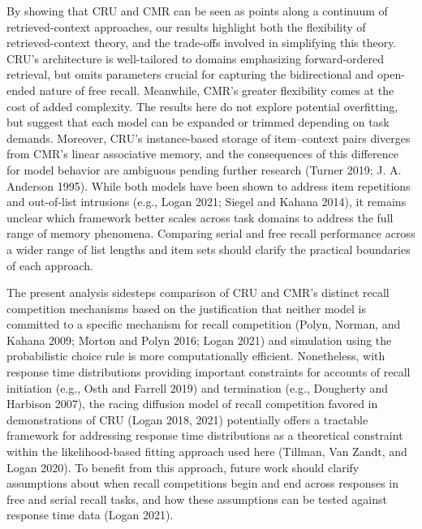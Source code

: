 \documentclass[
  letterpaper,
  DIV=11,
  numbers=noendperiod]{scrartcl}
\begin{document}
By showing that CRU and CMR can be seen as points along a continuum of
retrieved-context approaches, our results highlight both the flexibility
of retrieved-context theory, and the trade-offs involved in simplifying
this theory. CRU's architecture is well-tailored to domains emphasizing
forward-ordered retrieval, but omits parameters crucial for capturing
the bidirectional and open-ended nature of free recall. Meanwhile, CMR's
greater flexibility comes at the cost of added complexity. The results
here do not explore potential overfitting, but suggest that each model
can be expanded or trimmed depending on task demands. Moreover, CRU's
instance-based storage of item--context pairs diverges from CMR's linear
associative memory, and the consequences of this difference for model
behavior are ambiguous pending further research (Turner 2019; J. A.
Anderson 1995). While both models have been shown to address item
repetitions and out-of-list intrusions (e.g., Logan 2021; Siegel and
Kahana 2014), it remains unclear which framework better scales across
task domains to address the full range of memory phenomena. Comparing
serial and free recall performance across a wider range of list lengths
and item sets should clarify the practical boundaries of each approach.

The present analysis sidesteps comparison of CRU and CMR's distinct
recall competition mechanisms based on the justification that neither
model is committed to a specific mechanism for recall competition
(Polyn, Norman, and Kahana 2009; Morton and Polyn 2016; Logan 2021) and
simulation using the probabilistic choice rule is more computationally
efficient. Nonetheless, with response time distributions providing
important constraints for accounts of recall initiation (e.g., Osth and
Farrell 2019) and termination (e.g., Dougherty and Harbison 2007), the
racing diffusion model of recall competition favored in demonstrations
of CRU (Logan 2018, 2021) potentially offers a tractable framework for
addressing response time distributions as a theoretical constraint
within the likelihood-based fitting approach used here (Tillman, Van
Zandt, and Logan 2020). To benefit from this approach, future work
should clarify assumptions about when recall competitions begin and end
across responses in free and serial recall tasks, and how these
assumptions can be tested against response time data (Logan 2021).
\end{document}
